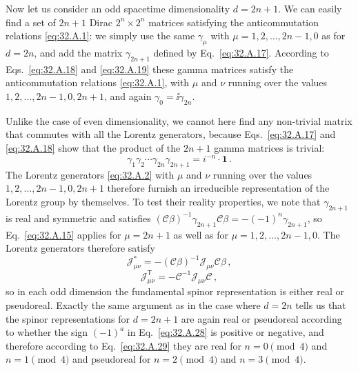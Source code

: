 Now let us consider an odd spacetime dimensionality \(d=2n+1\). We can
easily find a set of \(2n+1\) Dirac \(2^n\times2^n\) matrices satisfying the
anticommutation relations \eqref{eq:32.A.1}: we simply use the same
\(\gamma_\mu\) with \(\mu=1,2,\ldots,2n-1,0\) as for \(d=2n\), and add
the matrix \(\gamma_{2n+1}\) defined by Eq.~\eqref{eq:32.A.17}. According
to Eqs.~\eqref{eq:32.A.18} and \eqref{eq:32.A.19} these gamma matrices
satisfy the anticommutation relations \eqref{eq:32.A.1}, with \(\mu\) and
\(\nu\) running over the values \(1,2,\ldots,2n-1,0,2n+1\), and again
\(\gamma_0=\ii\gamma_{2n}\).

Unlike the case of even dimensionality, we cannot here find any non-trivial
matrix that commutes with all the Lorentz generators, because
Eqs.~\eqref{eq:32.A.17} and \eqref{eq:32.A.18} show that the product of the
\(2n+1\) gamma matrices is trivial:
\begin{equation}
  \gamma_1\gamma_2\cdots\gamma_{2n}\gamma_{2n+1}
  =i^{-n}\mathbin{\cdot}\mathbf{1}\,.
  \tag{32.A.36}\label{eq:32.A.36}
\end{equation}
The Lorentz generators \eqref{eq:32.A.2} with \(\mu\) and \(\nu\) running
over the values \(1,2,\ldots,2n-1,0,2n+1\) therefore furnish an irreducible
representation of the Lorentz group by themselves. To test their reality
properties, we note that \(\gamma_{2n+1}\) is real and symmetric and
satisfies
\((\mathcal C\beta)^{-1}\gamma_{2n+1}\mathcal C\beta
=-(-1)^n\gamma_{2n+1}\), so Eq.~\eqref{eq:32.A.15} applies for
\(\mu=2n+1\) as well as for \(\mu=1,2,\ldots,2n-1,0\). The Lorentz
generators therefore satisfy
\begin{equation}
  \mathcal J_{\mu\nu}^*
  =-(\mathcal C\beta)^{-1}\mathcal J_{\mu\nu}\mathcal C\beta\,,
  \tag{32.A.37}\label{eq:32.A.37}
\end{equation}
\begin{equation}
  \mathcal J_{\mu\nu}^{\mathsf T}
  =-\mathcal C^{-1}\mathcal J_{\mu\nu}\mathcal C\,,
  \tag{32.A.38}\label{eq:32.A.38}
\end{equation}
so in each odd dimension the fundamental spinor representation is either
real or pseudoreal. Exactly the same argument as in the case where \(d=2n\)
tells us that the spinor representations for \(d=2n+1\) are again real or
pseudoreal according to whether the sign \((-1)^a\) in
Eq.~\eqref{eq:32.A.28} is positive or negative, and therefore according to
Eq.~\eqref{eq:32.A.29} they are real for \(n=0\pmod 4\) and
\(n=1\pmod 4\) and pseudoreal for \(n=2\pmod 4\) and \(n=3\pmod 4\).

